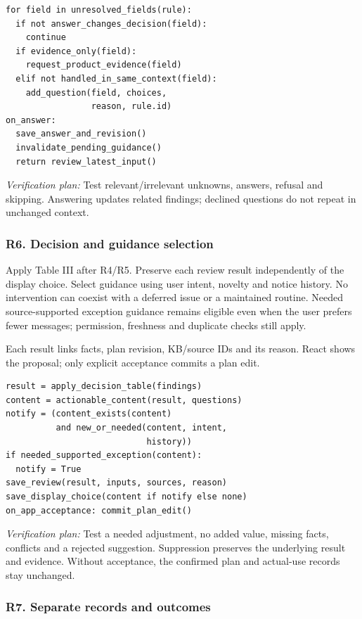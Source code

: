 \documentclass[conference,letterpaper]{IEEEtran}
\begin{document}
\begin{lstlisting}
for field in unresolved_fields(rule):
  if not answer_changes_decision(field):
    continue
  if evidence_only(field):
    request_product_evidence(field)
  elif not handled_in_same_context(field):
    add_question(field, choices,
                 reason, rule.id)
on_answer:
  save_answer_and_revision()
  invalidate_pending_guidance()
  return review_latest_input()
\end{lstlisting}



\textit{Verification plan:} Test relevant/irrelevant unknowns, answers, refusal and skipping. Answering updates related findings; declined questions do not repeat in unchanged context.

\subsubsection*{R6. Decision and guidance selection}

Apply Table III after R4/R5. Preserve each review result independently of the display choice. Select guidance using user intent, novelty and notice history. No intervention can coexist with a deferred issue or a maintained routine. Needed source-supported exception guidance remains eligible even when the user prefers fewer messages; permission, freshness and duplicate checks still apply.

Each result links facts, plan revision, KB/source IDs and its reason. React shows the proposal; only explicit acceptance commits a plan edit.

\begin{lstlisting}
result = apply_decision_table(findings)
content = actionable_content(result, questions)
notify = (content_exists(content)
          and new_or_needed(content, intent,
                            history))
if needed_supported_exception(content):
  notify = True
save_review(result, inputs, sources, reason)
save_display_choice(content if notify else none)
on_app_acceptance: commit_plan_edit()
\end{lstlisting}



\textit{Verification plan:} Test a needed adjustment, no added value, missing facts, conflicts and a rejected suggestion. Suppression preserves the underlying result and evidence. Without acceptance, the confirmed plan and actual-use records stay unchanged.

\subsubsection*{R7. Separate records and outcomes}
\end{document}
